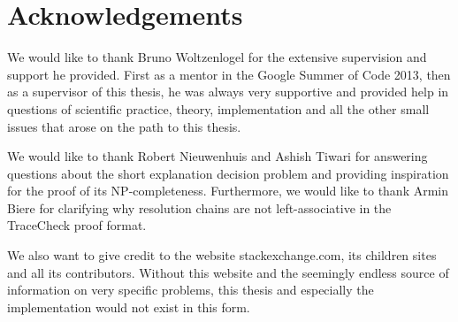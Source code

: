 \chapter*{Acknowledgements}
\vspace*{\fill}

We would like to thank Bruno Woltzenlogel for the extensive supervision and support he provided.
First as a mentor in the Google Summer of Code 2013, then as a supervisor of this thesis, he was always very supportive and provided help in questions of scientific practice, theory, implementation and all the other small issues that arose on the path to this thesis.

We would like to thank Robert Nieuwenhuis and Ashish Tiwari for answering questions about the short explanation decision problem and providing inspiration for the proof of its NP-completeness. Furthermore, we would like to thank Armin Biere for clarifying why resolution chains are not left-associative in the TraceCheck proof format. 

We also want to give credit to the website stackexchange.com, its children sites and all its contributors. Without this website and the seemingly endless source of information on very specific problems, this thesis and especially the implementation would not exist in this form.
\vspace*{\fill}